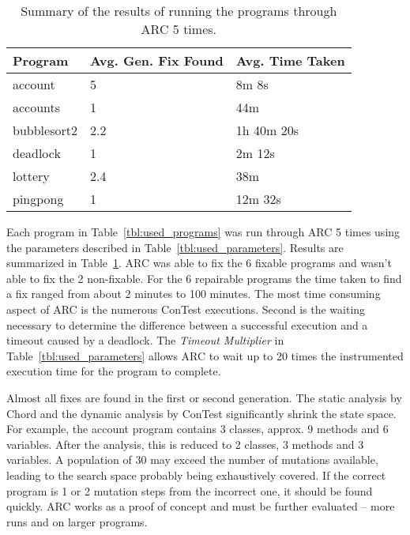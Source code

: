 \documentclass[runningheads,a4paper]{llncs}
\begin{document}
\begin{table}[t!]
\caption{Summary of the results of running the programs through ARC 5 times.}
\begin{center}
\lstset{basicstyle=\scriptsize}
\begin{tabular}{|l|l|l|}
\hline
\textbf{Program} & 
\textbf{Avg. Gen. Fix Found} & 
\textbf{Avg. Time Taken} 
\\\hline
account & 5 & 8m 8s
\\\hline
accounts & 1 & 44m
\\\hline
bubblesort2 & 2.2 & 1h 40m 20s
\\\hline
deadlock & 1 & 2m 12s
\\\hline
lottery & 2.4 & 38m
\\\hline
pingpong & 1 & 12m 32s
\\\hline

\end{tabular}
\label{tbl:summary_results}
\end{center}
\end{table}

Each program in Table~\ref{tbl:used_programs} was run through ARC 5 times using the parameters described in Table~\ref{tbl:used_parameters}. Results are summarized in Table~\ref{tbl:summary_results}. ARC was able to fix the 6 fixable programs and wasn't able to fix the 2 non-fixable. For the 6 repairable programs the time taken to find a fix ranged from about 2 minutes to 100 minutes. The most time consuming aspect of ARC is the numerous ConTest executions. Second is the waiting necessary to determine the difference between a successful execution and a timeout caused by a deadlock. The \textit{Timeout Multiplier} in Table~\ref{tbl:used_parameters} allows ARC to wait up to 20 times the instrumented execution time for the program to complete.

Almost all fixes are found in the first or second generation.  The static analysis by Chord and the dynamic analysis by ConTest significantly shrink the state space.  For example, the account program contains 3 classes, approx. 9 methods and 6 variables.  After the analysis, this is reduced to 2 classes, 3 methods and 3 variables.  A population of 30 may exceed the number of mutations available, leading to the search space probably being exhaustively covered.  If the correct program is 1 or 2 mutation steps from the incorrect one, it should be found quickly.  ARC works as a proof of concept and must be further evaluated -- more runs and on larger programs.
\end{document}
